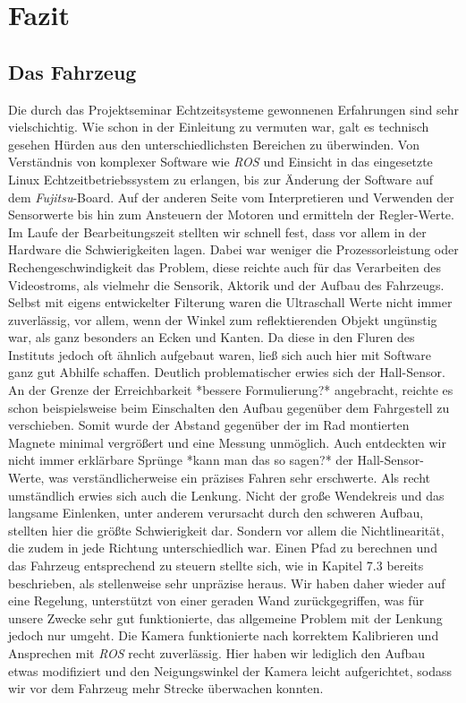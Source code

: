 \section{Fazit}
\label{sec:fazit}
\subsection{Das Fahrzeug}
Die durch das Projektseminar Echtzeitsysteme gewonnenen Erfahrungen sind sehr vielschichtig. Wie schon in der Einleitung zu vermuten war, galt es technisch gesehen Hürden aus den unterschiedlichsten Bereichen zu überwinden. Von Verständnis von komplexer Software wie \textit{ROS} und Einsicht in das eingesetzte Linux Echtzeitbetriebssystem zu erlangen, bis zur Änderung der Software auf dem \textit{Fujitsu}-Board. Auf der anderen Seite vom Interpretieren und Verwenden der Sensorwerte bis hin zum Ansteuern der Motoren und ermitteln der Regler-Werte. Im Laufe der Bearbeitungszeit stellten wir schnell fest, dass vor allem in der Hardware die Schwierigkeiten lagen. Dabei war weniger die Prozessorleistung oder Rechengeschwindigkeit das Problem, diese reichte auch für das Verarbeiten des Videostroms, als vielmehr die Sensorik, Aktorik und der Aufbau des Fahrzeugs. Selbst mit eigens entwickelter Filterung waren die Ultraschall Werte nicht immer zuverlässig, vor allem, wenn der Winkel zum reflektierenden Objekt ungünstig war, als ganz besonders an Ecken und Kanten. Da diese in den Fluren des Instituts jedoch oft ähnlich aufgebaut waren, ließ sich auch hier mit Software ganz gut Abhilfe schaffen. Deutlich problematischer erwies sich der Hall-Sensor. An der Grenze der Erreichbarkeit *bessere Formulierung?* angebracht, reichte es schon beispielsweise beim Einschalten den Aufbau gegenüber dem Fahrgestell zu verschieben. Somit wurde der Abstand gegenüber der im Rad montierten Magnete minimal vergrößert und eine Messung unmöglich. Auch entdeckten wir nicht immer erklärbare Sprünge *kann man das so sagen?* der Hall-Sensor-Werte, was verständlicherweise ein präzises Fahren sehr erschwerte. Als recht umständlich erwies sich auch die Lenkung. Nicht der große Wendekreis und das langsame Einlenken, unter anderem verursacht durch den schweren Aufbau, stellten hier die größte Schwierigkeit dar. Sondern vor allem die Nichtlinearität, die zudem in jede Richtung unterschiedlich war. Einen Pfad zu berechnen und das Fahrzeug entsprechend zu steuern stellte sich, wie in Kapitel 7.3 bereits beschrieben, als stellenweise sehr unpräzise heraus. Wir haben daher wieder auf eine Regelung, unterstützt von einer geraden Wand zurückgegriffen, was für unsere Zwecke sehr gut funktionierte, das allgemeine Problem mit der Lenkung jedoch nur umgeht. Die Kamera funktionierte nach korrektem Kalibrieren und Ansprechen mit \textit{ROS} recht zuverlässig. Hier haben wir lediglich den Aufbau etwas modifiziert und den Neigungswinkel der Kamera leicht aufgerichtet, sodass wir vor dem Fahrzeug mehr Strecke überwachen konnten.

